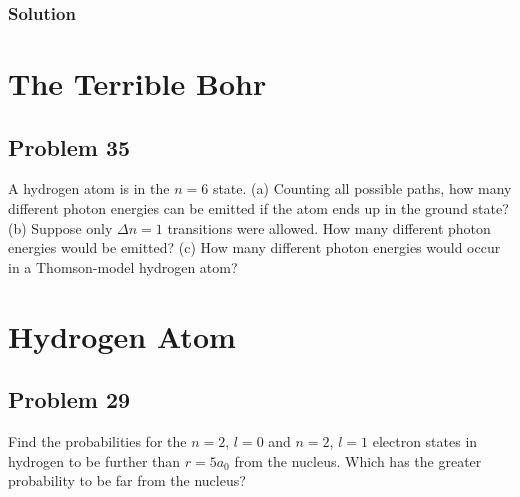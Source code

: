 \documentclass[12pt]{report}
\begin{document}
    \subsection{Solution}
        
\chapter{The Terrible Bohr}

\pagebreak
\section{Problem 35}
    A hydrogen atom is in the $n = 6$ state. 
    (a) Counting all possible paths, how many different photon energies can be emitted if the atom ends up in the ground state? 
    (b) Suppose only $\Delta n = 1$ transitions were allowed. 
    How many different photon energies would be emitted? 
    (c) How many different photon energies would occur in a Thomson-model hydrogen atom?

\chapter{Hydrogen Atom}

\pagebreak
\section{Problem 29}
    Find the probabilities for the $n = 2$, $l = 0$ and $n = 2$, $l = 1$ electron states in hydrogen to be further than $r = 5a_0$ from the nucleus. 
    Which has the greater probability to be far from the nucleus?

\setcounter{chapter}{7}
\end{document}
